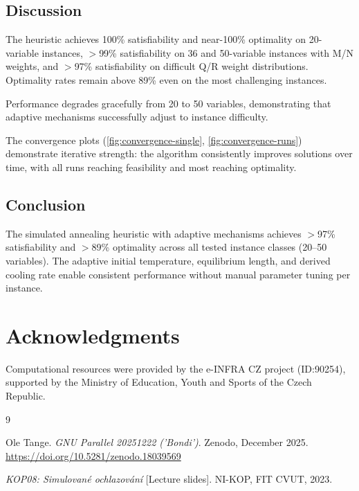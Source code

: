 \documentclass[11pt]{article}
\begin{document}
    \subsection{Discussion}

    The heuristic achieves 100\% satisfiability and near-100\% optimality on 20-variable instances,
    $>$99\% satisfiability on 36 and 50-variable instances with M/N weights, and $>$97\%
    satisfiability on difficult Q/R weight distributions.
    Optimality rates remain above 89\% even on the most challenging instances.

    Performance degrades gracefully from 20 to 50 variables, demonstrating that adaptive mechanisms
    successfully adjust to instance difficulty.

    The convergence plots (\autoref{fig:convergence-single}, \autoref{fig:convergence-runs}) demonstrate
    iterative strength: the algorithm consistently improves solutions over time, with all runs
    reaching feasibility and most reaching optimality.

    \subsection{Conclusion}

    The simulated annealing heuristic with adaptive mechanisms achieves $>$97\% satisfiability
    and $>$89\% optimality across all tested instance classes (20--50 variables).
    The adaptive initial temperature, equilibrium length, and derived cooling rate enable consistent performance
    without manual parameter tuning per instance.


    \section*{Acknowledgments}

    Computational resources were provided by the e-INFRA CZ project (ID:90254),
    supported by the Ministry of Education, Youth and Sports of the Czech Republic.

    \begin{thebibliography}{9}

        Ole Tange.
        \textit{GNU Parallel 20251222 ('Bondi')}.
        Zenodo, December 2025.
        \url{https://doi.org/10.5281/zenodo.18039569}

        \textit{KOP08: Simulované ochlazování} [Lecture slides].
        NI-KOP, FIT CVUT, 2023.

    \end{thebibliography}
\end{document}
